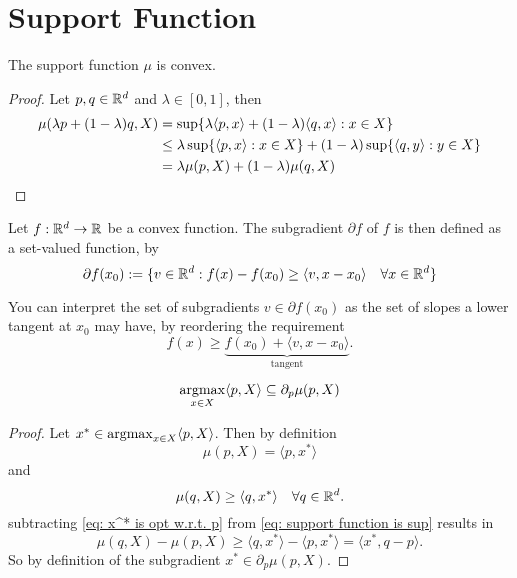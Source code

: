 \section{Support Function}

\begin{lemma}[Convexity]
	The support function \(\mu\) is convex.	
\end{lemma}
\begin{proof}
	Let \(p,q \in \mathbb{R}^d\) and \(\lambda\in[0,1]\), then
	\begin{align*}
		\mu(\lambda p + (1-\lambda)q , X)
		&= \sup\{\lambda \langle  p , x\rangle + (1-\lambda)\langle q, x\rangle : x\in X\}\\
		&\le \lambda \sup\{\langle p, x\rangle :x\in X\}
		+ (1-\lambda) \sup\{\langle q, y\rangle : y \in X\}\\
		&= \lambda \mu(p, X)+ (1-\lambda)\mu(q, X)
		\qedhere
	\end{align*}
\end{proof}

\begin{definition}[Subgradient]
	Let \(f:\mathbb{R}^d\to \mathbb{R}\) be a convex function. The subgradient
	\(\partial f\) of \(f\) is then defined as a set-valued function, by
	\[
		\partial f(x_0)
		:= \{
			v\in \mathbb{R}^d :
			f(x)-f(x_0) \ge \langle v, x-x_0\rangle
			\quad \forall x\in\mathbb{R}^d
		\}
	\]
\end{definition}

You can interpret the set of subgradients \(v\in\partial f(x_0)\) as the
set of slopes a lower tangent at \(x_0\) may have, by reordering the requirement
\[
	f(x) \ge \underbrace{f(x_0) + \langle v, x-x_0\rangle}_{\text{tangent}}.
\]

\begin{lemma}
	\[
		\operatorname*{argmax}_{x\in X}\langle p, X\rangle \subseteq \partial_p \mu(p, X)
	\]
\end{lemma}
\begin{proof}
	Let \(x^* \in \operatorname*{argmax}_{x\in X}\langle p, X\rangle\). Then by definition
	\begin{equation}
		\label{eq: x^* is opt w.r.t. p}
		\mu(p, X) = \langle p, x^*\rangle
	\end{equation}
	and
	\begin{equation}
		\label{eq: support function is sup}
		\mu(q, X) \ge \langle q, x^*\rangle \quad \forall q\in\mathbb{R}^d.
	\end{equation}
	subtracting \eqref{eq: x^* is opt w.r.t. p} from \eqref{eq: support function is sup}
	results in
	\[
		\mu(q, X) - \mu(p, X)
		\ge \langle q, x^*\rangle - \langle p, x^*\rangle
		= \langle x^*, q-p\rangle.
	\]
	So by definition of the subgradient \(x^*\in \partial_p \mu(p, X)\).
\end{proof}

